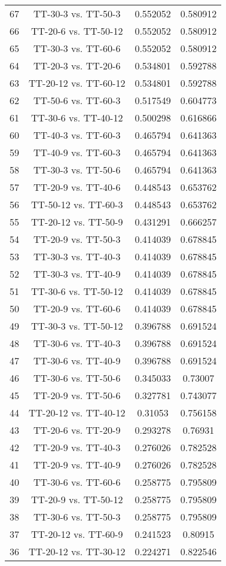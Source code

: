 \documentclass[a4paper,10pt]{article}
\begin{document}
\begin{landscape}
\begin{table}[!htp]
\begin{tabular}{cccc}
67&TT-30-3 vs. TT-50-3&0.552052&0.580912\\
66&TT-20-6 vs. TT-50-12&0.552052&0.580912\\
65&TT-30-3 vs. TT-60-6&0.552052&0.580912\\
64&TT-20-3 vs. TT-20-6&0.534801&0.592788\\
63&TT-20-12 vs. TT-60-12&0.534801&0.592788\\
62&TT-50-6 vs. TT-60-3&0.517549&0.604773\\
61&TT-30-6 vs. TT-40-12&0.500298&0.616866\\
60&TT-40-3 vs. TT-60-3&0.465794&0.641363\\
59&TT-40-9 vs. TT-60-3&0.465794&0.641363\\
58&TT-30-3 vs. TT-50-6&0.465794&0.641363\\
57&TT-20-9 vs. TT-40-6&0.448543&0.653762\\
56&TT-50-12 vs. TT-60-3&0.448543&0.653762\\
55&TT-20-12 vs. TT-50-9&0.431291&0.666257\\
54&TT-20-9 vs. TT-50-3&0.414039&0.678845\\
53&TT-30-3 vs. TT-40-3&0.414039&0.678845\\
52&TT-30-3 vs. TT-40-9&0.414039&0.678845\\
51&TT-30-6 vs. TT-50-12&0.414039&0.678845\\
50&TT-20-9 vs. TT-60-6&0.414039&0.678845\\
49&TT-30-3 vs. TT-50-12&0.396788&0.691524\\
48&TT-30-6 vs. TT-40-3&0.396788&0.691524\\
47&TT-30-6 vs. TT-40-9&0.396788&0.691524\\
46&TT-30-6 vs. TT-50-6&0.345033&0.73007\\
45&TT-20-9 vs. TT-50-6&0.327781&0.743077\\
44&TT-20-12 vs. TT-40-12&0.31053&0.756158\\
43&TT-20-6 vs. TT-20-9&0.293278&0.76931\\
42&TT-20-9 vs. TT-40-3&0.276026&0.782528\\
41&TT-20-9 vs. TT-40-9&0.276026&0.782528\\
40&TT-30-6 vs. TT-60-6&0.258775&0.795809\\
39&TT-20-9 vs. TT-50-12&0.258775&0.795809\\
38&TT-30-6 vs. TT-50-3&0.258775&0.795809\\
37&TT-20-12 vs. TT-60-9&0.241523&0.80915\\
36&TT-20-12 vs. TT-30-12&0.224271&0.822546\\

\end{tabular}
\end{table}
\end{landscape}
\end{document}
